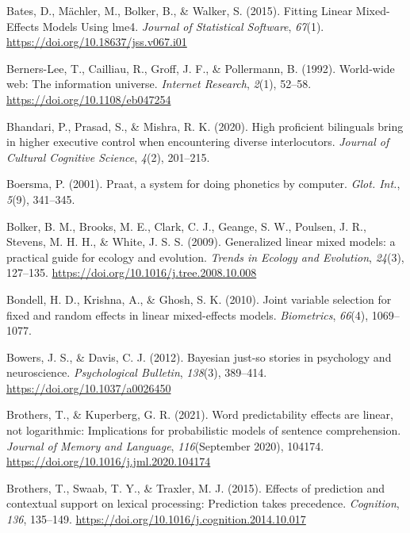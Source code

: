 \documentclass[a4paper, nobind]{templates/ociamthesis}
\newlength{\cslhangindent}
\newenvironment{CSLReferences}[2] %
 {%
  \setlength{\parindent}{0pt}
  \ifodd #1
  \let\oldpar\par
  \def\par{\hangindent=\cslhangindent\oldpar}
  \fi
  \setlength{\parskip}{1mm}
  \setlength{\baselineskip}{6mm}
 }%
 {}
\begin{document}
\begin{CSLReferences}{1}{0}
\leavevmode{}%
Bates, D., Mächler, M., Bolker, B., \& Walker, S. (2015). Fitting Linear Mixed-Effects Models Using lme4. \emph{Journal of Statistical Software}, \emph{67}(1). \url{https://doi.org/10.18637/jss.v067.i01}

\leavevmode{}%
Berners-Lee, T., Cailliau, R., Groff, J. F., \& Pollermann, B. (1992). {World-wide web: The information universe}. \emph{Internet Research}, \emph{2}(1), 52--58. \url{https://doi.org/10.1108/eb047254}

\leavevmode{}%
Bhandari, P., Prasad, S., \& Mishra, R. K. (2020). High proficient bilinguals bring in higher executive control when encountering diverse interlocutors. \emph{Journal of Cultural Cognitive Science}, \emph{4}(2), 201--215.

\leavevmode{}%
Boersma, P. (2001). Praat, a system for doing phonetics by computer. \emph{Glot. Int.}, \emph{5}(9), 341--345.

\leavevmode{}%
Bolker, B. M., Brooks, M. E., Clark, C. J., Geange, S. W., Poulsen, J. R., Stevens, M. H. H., \& White, J. S. S. (2009). {Generalized linear mixed models: a practical guide for ecology and evolution}. \emph{Trends in Ecology and Evolution}, \emph{24}(3), 127--135. \url{https://doi.org/10.1016/j.tree.2008.10.008}

\leavevmode{}%
Bondell, H. D., Krishna, A., \& Ghosh, S. K. (2010). Joint variable selection for fixed and random effects in linear mixed-effects models. \emph{Biometrics}, \emph{66}(4), 1069--1077.

\leavevmode{}%
Bowers, J. S., \& Davis, C. J. (2012). {Bayesian just-so stories in psychology and neuroscience}. \emph{Psychological Bulletin}, \emph{138}(3), 389--414. \url{https://doi.org/10.1037/a0026450}

\leavevmode{}%
Brothers, T., \& Kuperberg, G. R. (2021). {Word predictability effects are linear, not logarithmic: Implications for probabilistic models of sentence comprehension}. \emph{Journal of Memory and Language}, \emph{116}(September 2020), 104174. \url{https://doi.org/10.1016/j.jml.2020.104174}

\leavevmode{}%
Brothers, T., Swaab, T. Y., \& Traxler, M. J. (2015). {Effects of prediction and contextual support on lexical processing: Prediction takes precedence}. \emph{Cognition}, \emph{136}, 135--149. \url{https://doi.org/10.1016/j.cognition.2014.10.017}


\end{CSLReferences}
\end{document}
